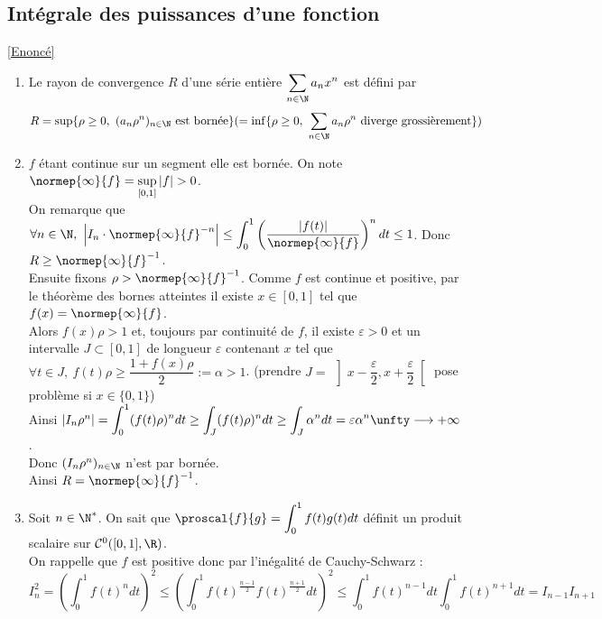 \documentclass{book}
\begin{document}
	\subsection{Intégrale des puissances d'une fonction }
	\label{Intégrale des puissances d'une fonction corrigé}
	\textcolor{blue}{\hyperref[Intégrale des puissances d'une fonction]{[Enoncé]}}\\
	\begin{enumerate}[leftmargin=*]
		\item Le rayon de convergence $R$ d'une série entière $\displaystyle\sum_{n\in \N}a_nx^n$ est défini par $$R=\sup\{\rho\geq 0,\ (a_n\rho^n)_{n\in \N}\text{ est bornée}\}(=\inf\{\rho\geq 0,\ \displaystyle\sum_{n\in \N}a_n\rho^n\text{ diverge grossièrement}\})$$
		\item $f$ étant continue sur un segment elle est bornée. On note $\normep{\infty}{f}=\sup\limits_{[0,1]}|f|>0$.\\
		On remarque que $\forall n\in \N,\ \left|I_n\cdot\normep{\infty}{f}^{-n}\right|\leq\displaystyle\int_0^1\left(\frac{|f(t)|}{\normep{\infty}{f}}\right)^ndt\leq 1$. Donc $R\geq \normep{\infty}{f}^{-1}$.\\
		Ensuite fixons $\rho>\normep{\infty}{f}^{-1}$. Comme $f$ est continue et positive, par le théorème des bornes atteintes il existe $x\in [0,1]$ tel que $f(x)=\normep{\infty}{f}$.\\
		Alors $f(x)\rho>1$ et, toujours par continuité de $f$, il existe $\varepsilon>0$ et un intervalle $J\subset [0,1]$ de longueur $\varepsilon$ contenant $x$ tel que $\forall t\in J,\ f(t)\rho\geq \dfrac{1+f(x)\rho}{2}:=\alpha>1$. (prendre $J=\ \left]x-\dfrac{\varepsilon}{2},x+\dfrac{\varepsilon}{2}\right[$ pose problème si $x\in\{0,1\}$)\\
		Ainsi $|I_n\rho^n|=\displaystyle\int_0^1(f(t)\rho)^ndt\geq \int_J(f(t)\rho)^ndt\geq \int_J\alpha^ndt=\varepsilon\alpha^n\unfty\longrightarrow+\infty$.\\
		Donc $(I_n\rho^n)_{n\in \N}$ n'est par bornée.\\
		Ainsi $R=\normep{\infty}{f}^{-1}$.
		\item Soit $n\in \N^*$. On sait que $\proscal{f}{g}=\displaystyle\int_0^1f(t)g(t)dt$ définit un produit scalaire sur $\mathcal C^0([0,1],\R)$.\\
		On rappelle que $f$ est positive donc par l'inégalité de Cauchy-Schwarz :
		$$I_n^2=\left(\int_0^1f(t)^ndt\right)^2\leq \left(\int_0^1f(t)^{\frac{n-1}{2}}f(t)^{\frac{n+1}{2}}dt\right)^2\leq\int_0^1f(t)^{n-1}dt\int_0^1f(t)^{n+1}dt=I_{n-1}I_{n+1}$$

\end{enumerate}
\end{document}
